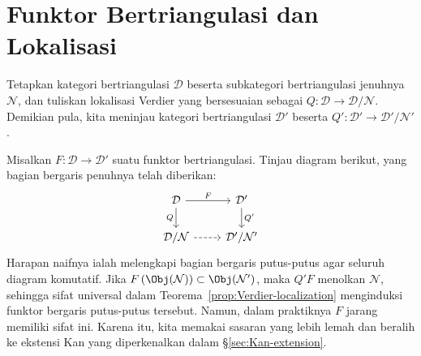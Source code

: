 
\section{Funktor Bertriangulasi dan Lokalisasi}\label{sec:triangulated-functor-localization}
\hypertarget{o014.aljabr2.chapter4.triangulated-functor-localization}{ }

Tetapkan kategori bertriangulasi $\mathcal{D}$ beserta subkategori
bertriangulasi jenuhnya $\mathcal{N}$, dan tuliskan lokalisasi Verdier yang
bersesuaian sebagai $Q: \mathcal{D} \to \mathcal{D}/\mathcal{N}$. Demikian
pula, kita meninjau kategori bertriangulasi $\mathcal{D}'$ beserta
$Q': \mathcal{D}' \to \mathcal{D}'/\mathcal{N}'$.

Misalkan $F: \mathcal{D} \to \mathcal{D}'$ suatu funktor bertriangulasi.
Tinjau diagram berikut, yang bagian bergaris penuhnya telah diberikan:
\begin{equation}\label{eqn:derived-situation}\begin{tikzcd}
	\mathcal{D} \arrow[r, "F"] \arrow[d, "Q"'] & \mathcal{D}' \arrow[d, "{Q'}"] \\
	\mathcal{D}/\mathcal{N} \arrow[dashed, r] & \mathcal{D}'/\mathcal{N}'
\end{tikzcd}\end{equation}
Harapan naifnya ialah melengkapi bagian bergaris putus-putus agar seluruh
diagram komutatif. Jika
$F\left(\Obj(\mathcal{N})\right) \subset \Obj(\mathcal{N}')$, maka $Q'F$
menolkan $\mathcal{N}$, sehingga sifat universal dalam
Teorema~\ref{prop:Verdier-localization} menginduksi funktor bergaris
putus-putus tersebut. Namun, dalam praktiknya $F$ jarang memiliki sifat ini.
Karena itu, kita memakai sasaran yang lebih lemah dan beralih ke ekstensi Kan
yang diperkenalkan dalam \S\ref{sec:Kan-extension}.

